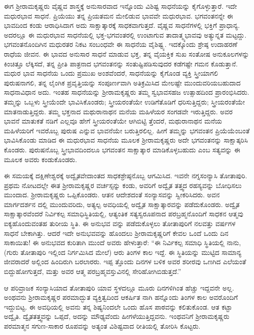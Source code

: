 ಈಗ ಶ್ರೀರಾಮಕೃಷ್ಣರು ವೈಷ್ಣವ ಶಾಸ್ತ್ರಕ್ಕೆ ಅನುಸಾರವಾದ ಇನ್ನೊಂದು ವಿಶಿಷ್ಟ ಸಾಧನೆಯನ್ನು ಕೈಗೊಳ್ಳುತ್ತಾರೆ. ಇದೇ ಮಧುರಭಾವ ಸಾಧನೆ. ಪ್ರಿಯೆಯು ತನ್ನ ಪ್ರಿಯತಮನ ಮೇಲಿಡುವ ಭಾವವೇ ಮಧುರಭಾವ. ಭಗವಂತನನ್ನೇ ಈ ಭಾವದಿಂದ ಕಂಡು ಆರಾಧಿಸಿದಾಗ ಅದು ಸಾಕ್ಷಾತ್ಕಾರಕ್ಕೆ ಸಾಧಕವಾಗುತ್ತದೆ. ವೈಷ್ಣವ ಸಾಧನೆಗಳಲ್ಲಿ ಭಕ್ತಿಗೆ ಪ್ರಾಧಾನ್ಯ. ಅದರಲ್ಲೂ ಈ ಮಧುರಭಾವ ಸಾಧನೆಯಲ್ಲಿ ಭಕ್ತ-ಭಗವಂತರಲ್ಲಿ ಉಂಟಾಗುವ ತಾದಾತ್ಮ್ಯಭಾವವು ಅತ್ಯುನ್ನತ ಮಟ್ಟದ್ದು. ಭಗವಂತನೊಂದಿಗಿನ ಮಧುರತರ ನಿಕಟ ಸಂಬಂಧವೇ ಈ ಸಾಧನೆಯ ವೈಶಿಷ್ಟ್ಯ. ಇದಕ್ಕೊಂದು ಶ್ರೇಷ್ಠ ಉದಾಹರಣೆ ರಾಧೆಯ ಜೀವನ. ಈ ಭಾವದ ಅನುಸಾರ ಸಾಧನೆ ಮಾಡುವ ಭಕ್ತ, ತನ್ನ ವೈಯಕ್ತಿಕ ಸುಖ ಸಂತೋಷ ಅನುಕೂಲಗಳನ್ನು ಕಿಂಚಿತ್ತೂ ಲೆಕ್ಕಿಸದೆ, ತನ್ನ ಪ್ರೀತಿ ಪಾತ್ರನಾದ ಭಗವಂತನನ್ನು ಸಂತುಷ್ಟಿಪಡಿಸುವುದರ ಕಡೆಗಷ್ಟೇ ಗಮನ ಕೊಡುತ್ತಾನೆ. ಮಧುರ ಭಾವ ಸಾಧನೆಯ ಒಂದು ಪ್ರಮುಖ ಅಂಶವೆಂದರೆ, ಸಾಧನೆಯನ್ನು ಕೈಗೊಂಡ ವ್ಯಕ್ತಿ ಸ್ತ್ರೀಯಾಗಲಿ ಪುರುಷನಾಗಲಿ, ತನ್ನ ಲೈಂಗಿಕ ಪ್ರವೃತ್ತಿಯನ್ನು ಸಂಪೂರ್ಣವಾಗಿ ಅತಿಕ್ರಮಿಸಿದ ಮೇಲಷ್ಟೇ ಮುಂದುವರಿಯಬಹುದಾದ ಸಾಧನಾವಿಧಾನ ಅದು. ಇಂತಹ ಸಾಧನೆಯನ್ನು ಶ್ರೀರಾಮಕೃಷ್ಣರು ತಮ್ಮ ಸ್ವಭಾವಸಹಜ ಉತ್ಸಾಹದಿಂದ ಪ್ರಾರಂಭಿಸಿದರು. ತಮ್ಮನ್ನು ಒಬ್ಬಳು ಸ್ತ್ರೀಯೆಂದೇ ಭಾವಿಸಿಕೊಂಡರು; ಸ್ತ್ರೀಯರಂತೆಯೇ ಉಡಿಗೆತೊಡಿಗೆ ಧರಿಸುತ್ತಿದ್ದರು; ಸ್ತ್ರೀಯರಂತೆಯೇ ಮಾತನಾಡುತ್ತಿದ್ದರು. ತಮ್ಮ ಭಕ್ತನಾದ ಮಥುರಾನಾಥನ ಮನೆಯ ಮಹಿಳೆಯರ ಸಂಗಡವೇ ಇರುತ್ತಿದ್ದರು. ಅವರ ಭಾವನೆ ಮಾತುಕತೆ ನಡಿಗೆ ಎಲ್ಲವೂ ಹೇಗೆ ಸ್ತ್ರೀಯರಂತೆಯೇ ಆಗಿಬಿಟ್ಟಿ ತ್ತೆಂದರೆ, ಮಥುರಾನಾಥನ ಮನೆಯ ಮಹಿಳೆಯರಿಗೆ ಇವರೊಬ್ಬ ಪುರುಷ ಎನ್ನುವ ಭಾವನೆಯೇ ಬರುತ್ತಿರಲಿಲ್ಲ. ಹೀಗೆ ತಮ್ಮನ್ನು ಭಗವಂತನ ಪ್ರಿಯೆಯೆಂಬಂತೆ ಭಾವಿಸಿಕೊಂಡು ಮಾಡಿದ ಈ ಮಧುರಭಾವ ಸಾಧನೆಯ ಮೂಲಕ ಶ್ರೀರಾಮಕೃಷ್ಣರು ಅದೇ ಭಗವಂತನನ್ನು ಸಾಕ್ಷಾತ್ಕರಿಸಿ ಕೊಂಡರು. ಪುರುಷನೊಬ್ಬ ಸ್ತ್ರೀಭಾವದಿಂದಲೂ ಭಗವಂತನ ಸಾಕ್ಷಾತ್ಕಾರ ಮಾಡಿಕೊಳ್ಳಬಹುದು ಎಂಬ ಸತ್ಯವನ್ನು ಈ ಮೂಲಕ ಅವರು ಕಂಡುಕೊಂಡರು.

ಈ ಸಮಯಕ್ಕೆ ದಕ್ಷಿಣೇಶ್ವರಕ್ಕೆ ಅದ್ವೈತವೇದಾಂತದ ಸಾಧಕಶ್ರೇಷ್ಠನೊಬ್ಬ ಆಗಮಿಸಿದ. ಇವನೇ ನಗ್ನಸಂನ್ಯಾಸಿ ತೋತಾಪುರಿ. ಪ್ರಥಮ ನೋಟದಲ್ಲೇ ಈತ ಶ್ರೀರಾಮಕೃಷ್ಣರ ವರ್ಚಸ್ಸನ್ನು ಕಂಡು, ಅವರಿಗೆ ಅದ್ವೈತ ತತ್ತ್ವದ ರಹಸ್ಯವನ್ನು ಬೋಧಿಸಲು ಮುಂದಾದ. ಶ್ರೀರಾಮಕೃಷ್ಣರು ಒಪ್ಪಿಕೊಂಡರು. ಆತನ ಆದೇಶದಂತೆ ಸಂನ್ಯಾಸವನ್ನು ಸ್ವೀಕರಿಸಿದರು. ಅವನ ಮಾರ್ಗದರ್ಶನ ದಲ್ಲಿ ಮುಂದುವರಿದು, ಅತ್ಯಲ್ಪ ಅವಧಿಯಲ್ಲಿ ಅದ್ವೈತ ಸಾಕ್ಷಾತ್ಕಾರವನ್ನು ಪಡೆದುಕೊಂಡರು. ಅದ್ವೈತ ಸಾಕ್ಷಾತ್ಕಾರವೆಂದರೆ ನಿರ್ವಿಕಲ್ಪ ಸಮಾಧಿಸ್ಥಿತಿಯಲ್ಲಿ, ಆತ್ಯಂತಿಕ ಸತ್ಯಸ್ವರೂಪನಾದ ಪರಬ್ರಹ್ಮನೊಂದಿಗೆ ಸಾಧಕನ ಆತ್ಮವು ಐಕ್ಯಹೊಂದುವಂತಹ ತುರೀಯ ಸ್ಥಿತಿ. ಈ ಅನುಭವ ವನ್ನು ಪಡೆದುಕೊಳ್ಳಲು ತೋತಾಪುರಿಗೆ ನಲವತ್ತು ವರ್ಷಗಳ ಸಾಧನೆ ಬೇಕಾಗಿತ್ತು. ಆದರೆ ಇದೇ ಅನುಭವವನ್ನು ಹೊಂದಲು ಶ್ರೀರಾಮಕೃಷ್ಣರಿಗೆ ಕೇವಲ ಒಂದೆ ಒಂದು ದಿನ ಸಾಕಾಯಿತು! ಈ ಅನುಭವದ ಕುರಿತಾಗಿ ಮುಂದೆ ಅವರು ಹೇಳುತ್ತಾರೆ: “ಈ ನಿರ್ವಿಕಲ್ಪ ಸಮಾಧಿ ಸ್ಥಿತಿಯಲ್ಲಿ ನಾನು, (ಗುರು ತೋತಾಪುರಿ ಇಲ್ಲಿಂದ ನಿರ್ಗಮಿಸಿದ ಮೇಲೆ) ಆರು ತಿಂಗಳ ಕಾಲ ಇದ್ದೆ. ಈ ಸ್ಥಿತಿಯನ್ನು ಮುಟ್ಟಿದ ಸಾಮಾನ್ಯ ಜೀವರಾದರೆ ಅಲ್ಲಿಂದ ಹಿಂದಿರುಗಿ ಬರಲಾರರು. ಇಪ್ಪ ತ್ತೊಂದು ದಿನಗಳ ಬಳಿಕ ಅವರ ಶರೀರವು ಒಣಗಿದ ಎಲೆಯಂತೆ ಬಿದ್ದುಹೋಗುತ್ತದೆ, ಮತ್ತು ಅವರ ಆತ್ಮ ಪರಬ್ರಹ್ಮವಸ್ತುವಿನಲ್ಲಿ ಸೇರಿಹೋಗಿಬಿಡುತ್ತದೆ.”

ಆ ಪರಿವ್ರಾಜಕ ಸಂನ್ಯಾಸಿಯಾದ ತೋತಾಪುರಿ ಯಾವ ಸ್ಥಳದಲ್ಲೂ ಮೂರು ದಿನಗಳಿಗಿಂತ ಹೆಚ್ಚು ಇದ್ದವನೇ ಅಲ್ಲ. ಅಂಥವನು ಶ್ರೀರಾಮಕೃಷ್ಣರ ಪರಮಾದ್ಭುತ ವ್ಯಕ್ತಿತ್ವದಿಂದ ಆಕರ್ಷಿತ ನಾಗಿ ಹನ್ನೊಂದು ತಿಂಗಳ ಕಾಲ ಅವರೊಂದಿಗೆ ಇದ್ದುಬಿಟ್ಟ. ಈ ಅವಧಿಯಲ್ಲಿ ಅವನು ತನ್ನ ಶಿಷ್ಯನಿಂದಲೇ ಒಂದು ಹೊಸ ಪಾಠವನ್ನು ಕಲಿತುಕೊಂಡ. ಆತ ಕಟ್ಟಾ ಅದ್ವೈತಿ. ದ್ವೈತತತ್ತ್ವವನ್ನು ಒಪ್ಪದೆ, ಅದನ್ನು ಮೌಢ್ಯವೆಂದು ಹೀಗಳೆಯುತ್ತಿದ್ದವನು. ಇಂಥವನಿಗೆ ಶ್ರೀರಾಮಕೃಷ್ಣರು ಪರಮಾತ್ಮನ ಸಗುಣ-ಸಾಕಾರ ರೂಪವನ್ನು ಅತ್ಯಂತ ವಿಶಿಷ್ಟವಾದ ರೀತಿಯಲ್ಲಿ ತೋರಿಸಿ ಕೊಟ್ಟರು.

